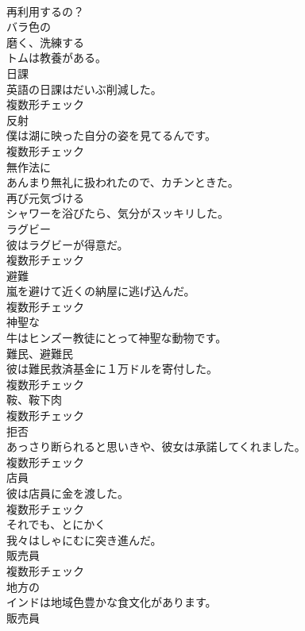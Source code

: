 \documentclass[8pt]{extreport}
\begin{document}
\begin{CJK}{UTF8}{min}
\\	再利用するの？	
\\	[形容詞]	バラ色の	
\\	[動詞]	磨く、洗練する	
\\	トムは教養がある。	
\\	[名詞]	日課	
\\	英語の日課はだいぶ削減した。	
\\	複数形チェック
\\	[名詞]	反射	
\\	僕は湖に映った自分の姿を見てるんです。	
\\	複数形チェック
\\	[副詞]	無作法に	
\\	あんまり無礼に扱われたので、カチンときた。	
\\	[動詞]	再び元気づける	
\\	シャワーを浴びたら、気分がスッキリした。	
\\	[名詞]	ラグビー	
\\	彼はラグビーが得意だ。	
\\	複数形チェック
\\	[名詞]	避難	
\\	嵐を避けて近くの納屋に逃げ込んだ。	
\\	複数形チェック
\\	[形容詞]	神聖な	
\\	牛はヒンズー教徒にとって神聖な動物です。	
\\	[名詞]	難⺠、避難⺠	
\\	彼は難民救済基金に１万ドルを寄付した。	
\\	複数形チェック
\\	[名詞]	鞍、鞍下肉	
\\	複数形チェック
\\	[名詞]	拒否	
\\	あっさり断られると思いきや、彼女は承諾してくれました。	
\\	複数形チェック
\\	[名詞]	店員	
\\	彼は店員に金を渡した。	
\\	複数形チェック
\\	[副詞]	それでも、とにかく	
\\	我々はしゃにむに突き進んだ。	
\\	[名詞]	販売員	
\\	複数形チェック
\\	[形容詞]	地方の	
\\	インドは地域色豊かな食文化があります。	
\\	[名詞]	販売員	

\end{CJK}
\end{document}

